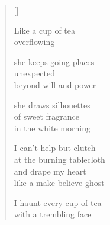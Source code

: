 \documentclass[12pt,a4paper]{article}
\begin{document}
\thispagestyle{empty}

\poemtitle{}

\settowidth{\versewidth}{Like a make-believe ghost}

\bigskip

\begin{verse}[\versewidth]

Like a cup of tea\\
overflowing

she keeps going places\\
unexpected\\
beyond will and power

she draws silhouettes\\
of sweet fragrance\\
in the white morning

I can't help but clutch\\
at the burning tablecloth\\
and drape my heart \\
like a make-believe ghost

I haunt every cup of tea\\
with a trembling face
\end{verse}
\end{document}
